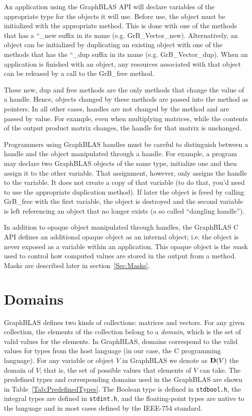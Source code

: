 An application using the GraphBLAS API will declare variables of the appropriate
type for the objects it will use.  Before use, the object must be initialized with 
the appropriate method.  This is done with one of the methods that has a ``{\sf \_new} suffix in its 
name (e.g. {\sf GrB\_Vector\_new}).  Alternatively, an object can be initialized by duplicating
an existing object with one of the methods that has the ``{\sf \_dup} suffix in its 
name  (e.g. {\sf GrB\_Vector\_dup}).   When an application is finished with 
an object, any resources associated with that object can be released by a
call to the {\sf GrB\_free} method.    

These {\sf new}, {\sf dup} and {\sf free} methods are the only methods that 
change the value of a handle.  Hence, objects changed by these methods are passed
into the method as pointers.  In all other cases, handles are not changed by the 
method and are passed by value.  For example, even when multiplying matrices, 
while the contents of the output product matrix changes, the handle for that matrix is unchanged. 

Programmers using GraphBLAS handles must be careful to distinguish between a handle and the 
object manipulated through a handle.  For example, a program may declare two 
GraphBLAS objects of the same type, initialize one and then assign it to the other
variable.  That assignment, however, only assigns the handle to the variable.  It does not 
create a copy of that variable (to do that, you'd need to use the appropriate duplication method).
If later the object is freed by calling {\sf GrB\_free} with the first variable, the object
is destroyed and the second variable is left referencing an object that no longer 
exists (a so called ``dangling handle'').

In addition to opaque object manipulated through handles, the GraphBLAS C API defines
an additional opaque object as an internal object; i.e. the object is never exposed as
a variable within an application.  This opaque object is the {\emph mask} used to
control how computed values are stored in the output from a method.  Masks 
are described later in section~\ref{Sec:Masks}.

\section{Domains}

GraphBLAS defines two kinds of collections: matrices and vectors.
For any given collection, the elements of the collection belong to
a \emph{domain}, which is the set of valid values for the elements.
In GraphBLAS, domains correspond to the valid values for types from
the host language (in our case, the C programming language).  For any
variable or object $V$ in GraphBLAS we denote as $\bold{D}(V)$ the
domain of $V$; that is, the set of possible values that elements of
$V$ can take.  The predefined types and corresponding domains used in the 
GraphBLAS are shown in Table~\ref{Tab:PredefinedTypes}.  The Boolean
type is defined in {\tt stdbool.h}, the integral types are defined in
{\tt stdint.h}, and the floating-point types are native to the language
and in most cases defined by the IEEE-754 standard.


